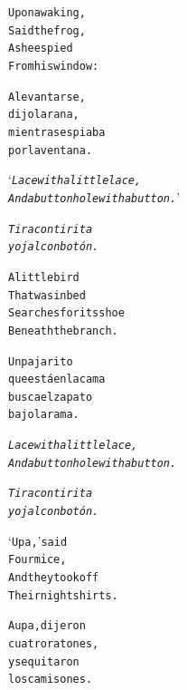 \documentclass[11pt]{article}
\begin{document}
\begin{parcolumns}{2}

\colchunk
{
\begin{alltt}\normalfont
Upon awaking,
Said the frog,
As he espied
From his window:
\end{alltt}
}

\colchunk
{
\begin{alltt}\normalfont
A levantarse,
dijo la rana,
mientras espiaba
por la ventana.
\end{alltt}
}

\colplacechunks

\colchunk
{
\begin{alltt}\normalfont
‘\emph{Lace with a little lace,
And a buttonhole with a button.}’
\end{alltt}
}

\colchunk
{
\begin{alltt}\normalfont
\emph{Tira con tirita
y ojal con botón.}
\end{alltt}
}

\colplacechunks

\colchunk
{
\begin{alltt}\normalfont
A little bird
That was in bed
Searches for its shoe
Beneath the branch.
\end{alltt}
}

\colchunk
{
\begin{alltt}\normalfont
Un pajarito
que está en la cama
busca el zapato
bajo la rama.
\end{alltt}
}

\colplacechunks

\colchunk
{
\begin{alltt}\normalfont
\emph{Lace with a little lace,
And a buttonhole with a button.}
\end{alltt}
}

\colchunk
{
\begin{alltt}\normalfont
\emph{Tira con tirita
y ojal con botón.}
\end{alltt}
}

\colplacechunks

\colchunk
{
\begin{alltt}\normalfont
‘Upa,’ said
Four mice,
And they took off
Their nightshirts.
\end{alltt}
}

\colchunk
{
\begin{alltt}\normalfont
Aupa, dijeron
cuatro ratones, 
y se quitaron
los camisones.
\end{alltt}
}


\end{parcolumns}
\end{document}

